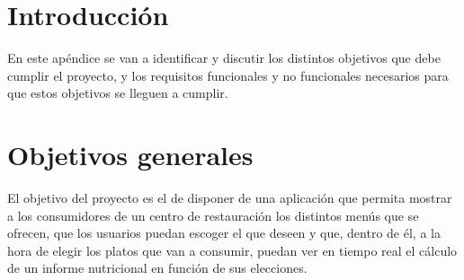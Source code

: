 
\section{Introducción}

En este apéndice se van a identificar y discutir los distintos objetivos que debe cumplir el proyecto, y los requisitos funcionales y no funcionales necesarios para que estos objetivos se lleguen a cumplir.

\begin{comment}
\begin{table}[p]
	\centering
	\begin{tabularx}{\linewidth}{ p{0.21\columnwidth} p{0.71\columnwidth} }
		\toprule
		\textbf{CU-1}    & \textbf{Ejemplo de caso de uso}\\
		\toprule
		\textbf{Versión}              & 1.0    \\
		\textbf{Autor}                & Alumno \\
		\textbf{Requisitos asociados} & RF-xx, RF-xx \\
		\textbf{Descripción}          & La descripción del CU \\
		\textbf{Precondición}         & Precondiciones (podría haber más de una) \\
		\textbf{Acciones}             &
		\begin{enumerate}
			\def\labelenumi{\arabic{enumi}.}
			\tightlist
			\item Pasos del CU
			\item Pasos del CU (añadir tantos como sean necesarios)
		\end{enumerate}\\
		\textbf{Postcondición}        & Postcondiciones (podría haber más de una) \\
		\textbf{Excepciones}          & Excepciones \\
		\textbf{Importancia}          & Alta o Media o Baja... \\
		\bottomrule
	\end{tabularx}
	\caption{CU-1 Nombre del caso de uso.}
\end{table}
\end{comment}

\section{Objetivos generales}

El objetivo del proyecto es el de disponer de una aplicación que permita mostrar a los consumidores de un centro de restauración los distintos menús que se ofrecen, que los usuarios puedan escoger el que deseen y que, dentro de él, a la hora de elegir los platos que van a consumir, puedan ver en tiempo real el cálculo de un informe nutricional en función de sus elecciones. 

